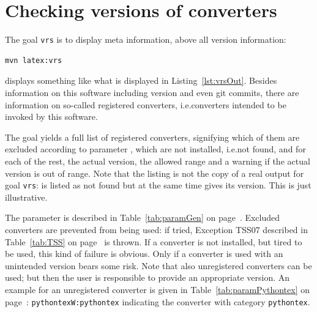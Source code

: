 

\section{Checking versions of converters}\label{sec:chkVersions}

The goal \texttt{vrs} is to display meta information, above all version information:
% 
\begin{Verbatim}
mvn latex:vrs
\end{Verbatim}
%
displays something like what is displayed in Listing~\ref{lst:vrsOut}. 
Besides information on this software including version and even git commits, 
there are information on so-called registered converters, 
i.e.\@ converters intended to be invoked by this software. 

The goal yields a full list of registered converters, 
signifying which of them are excluded 
according to parameter , 
which are not installed, i.e.\@ not found, 
and for each of the rest, the actual version, the allowed range 
and a warning if the actual version is out of range. 
Note that the listing is not the copy of a real output for goal \texttt{vrs}: 
 is listed as not found but at the same time gives its version. 
This is just illustrative. 

The parameter  
is described in Table~\ref{tab:paramGen} on page~\pageref{tab:paramGen}. 
Excluded converters are prevented from being used: 
if tried, Exception TSS07 
described in Table~\ref{tab:TSS} on page~\pageref{tab:TSS} is thrown. 
If a converter is not installed, but tired to be used, 
this kind of failure is obvious. 
Only if a converter is used with an unintended version bears some risk. 
Note that also unregistered converters can be used; 
but then the user is responsible to provide an appropriate version. 
An example for an unregistered converter 
is given in Table~\ref{tab:paramPythontex} on page~\pageref{tab:paramPythontex}: 
\texttt{pythontexW:pythontex} 
indicating the converter  with category \texttt{pythontex}. 


